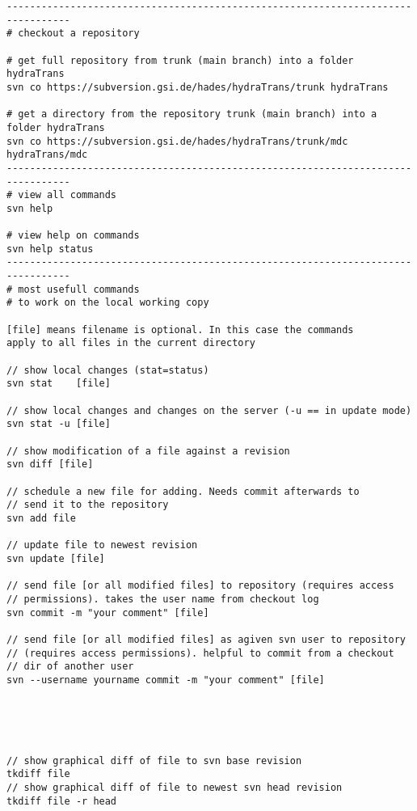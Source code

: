 \begin{lstlisting}
---------------------------------------------------------------------------------
# checkout a repository

# get full repository from trunk (main branch) into a folder hydraTrans
svn co https://subversion.gsi.de/hades/hydraTrans/trunk hydraTrans

# get a directory from the repository trunk (main branch) into a folder hydraTrans
svn co https://subversion.gsi.de/hades/hydraTrans/trunk/mdc hydraTrans/mdc
---------------------------------------------------------------------------------
# view all commands
svn help

# view help on commands
svn help status 
---------------------------------------------------------------------------------
# most usefull commands
# to work on the local working copy

[file] means filename is optional. In this case the commands
apply to all files in the current directory

// show local changes (stat=status)
svn stat    [file]                                        

// show local changes and changes on the server (-u == in update mode)
svn stat -u [file]                                        

// show modification of a file against a revision
svn diff [file]                                           

// schedule a new file for adding. Needs commit afterwards to 
// send it to the repository
svn add file                            

// update file to newest revision
svn update [file]                                         

// send file [or all modified files] to repository (requires access 
// permissions). takes the user name from checkout log
svn commit -m "your comment" [file]                       

// send file [or all modified files] as agiven svn user to repository 
// (requires access permissions). helpful to commit from a checkout 
// dir of another user
svn --username yourname commit -m "your comment" [file]   
                                                          
                                                          
                                                          


// show graphical diff of file to svn base revision
tkdiff file                                               
// show graphical diff of file to newest svn head revision
tkdiff file -r head                   

\end{lstlisting}




